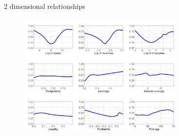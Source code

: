 \documentclass[notes]{beamer}
\begin{document}
\begin{frame}[label=2dim]{2 dimensional relationships}
\begin{figure}[H]  %
    \centering
    \includegraphics[width=0.73\textwidth]{presentations/varCFL.png}
\end{figure}
\restoregeometry %
\begin{center}
\hyperlink{nameit}{}
\end{center}

\end{frame}
\end{document}
